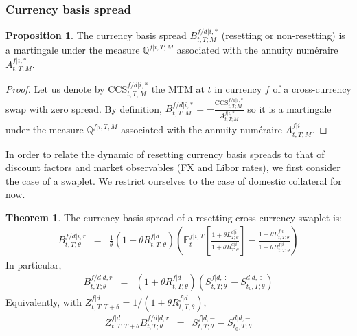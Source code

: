 \documentclass[11pt,english]{amsart}
\newcommand{\EE}{\mathbb{E}}
\newcommand{\QQ}{\mathbb{Q}}
\theoremstyle{definition}
\newtheorem{prop}{Proposition}
\newtheorem{theo}{Theorem}
\begin{document}
\subsubsection{Currency basis spread}


\begin{prop}\label{prop:aoa_currency_basis_spread}
The currency basis spread $B^{f/d|i,*}_{t,T;M}$ (resetting or non-resetting) is a martingale under the measure $\QQ^{f|i,T;M}$ associated with the annuity num\'{e}raire $A^{f|i,*}_{t,T;M}$. 
\end{prop}

\begin{proof}
Let us denote by $\mathrm{CCS}^{f/d|i,*}_{t,T;M}$ the MTM at $t$ in currency $f$ of a cross-currency swap with zero spread. By definition, $B^{f/d|i,*}_{t,T;M} = - \frac{ \mathrm{CCS}^{f/d|i,*}_{t,T;M} }{ A^{f|i,*}_{t,T;M} }$ so it is a martingale under the measure $\QQ^{f|i,T;M}$ associated with the annuity num\'{e}raire $A^{f|i}_{t,T;M}$. 
\end{proof}

In order to relate the dynamic of resetting currency basis spreads to that of discount factors and market observables (FX and Libor rates), we first consider the case of a swaplet. We restrict ourselves to the case of domestic collateral for now. 

\begin{theo}\label{theo:currency_basis_spread_constant_funding_basis}
The currency basis spread of a resetting cross-currency swaplet is:
\begin{eqnarray}
	B^{f/d|i,r}_{t,T;\theta} 
	&=& \frac{1}{\theta}\left(1+\theta R^{f|d}_{t,T;\theta} \right)  \left( \EE^{f|i,T}_t\left[ \frac{1+\theta L^{d|i}_{T;\theta}}{ 1+ \theta R^{d|i}_{T;\theta}} \right] - \frac{1+\theta L^{f|i}_{t,T;\theta}}{ 1+ \theta R^{f|i}_{t;T;\theta}}  \right)  
	\label{eq:cb_r_swaplet_general}
\end{eqnarray} 
In particular, 
\begin{eqnarray}
  B^{f/d|d,r}_{t,T;\theta} 
  &=& \left(1+\theta R^{f|d}_{t,T;\theta} \right)  \left(S^{f|d,\div}_{t,T;\theta} - S^{d|d,\div}_{t_0,T;\theta} \right)  
	\label{eq:cb_r_swaplet}
\end{eqnarray} 
Equivalently, with $Z^{f|d}_{t,T,T+\theta} = 1/(1+\theta R^{f|d}_{t,T;\theta})$,
\begin{eqnarray}
	Z^{f|d}_{t,T,T+\theta}B^{f/d|d,r}_{t,T;\theta} 
	&=&  S^{f|d,\div}_{t,T;\theta} - S^{d|d,\div}_{t_0,T;\theta} 
	\label{eq:cb_r_swaplet2}
\end{eqnarray} 
\end{theo}
\end{document}
